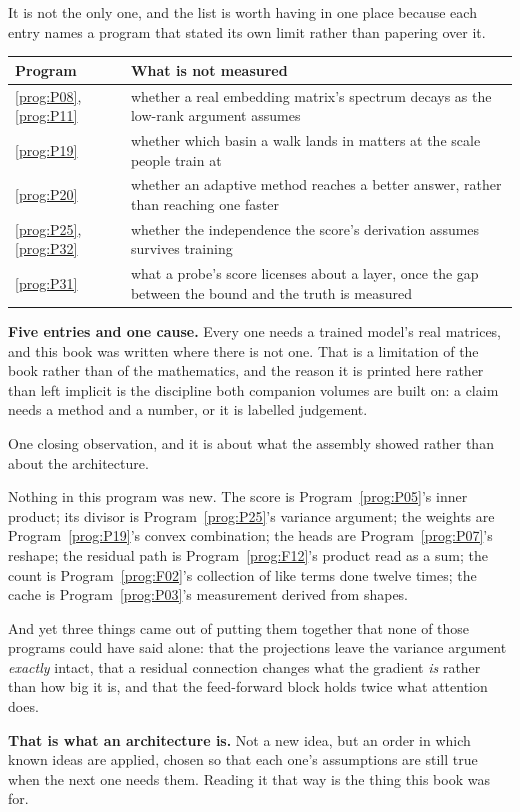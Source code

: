 \begin{fr}
It is not the only one, and the list is worth having in one place because
each entry names a program that stated its own limit rather than papering
over it.

\begin{center}
\begin{tabularx}{\linewidth}{lX}
\toprule
Program & What is not measured \\
\midrule
\ref{prog:P08}, \ref{prog:P11} & whether a real embedding matrix's spectrum
  decays as the low-rank argument assumes \\
\ref{prog:P19} & whether which basin a walk lands in matters at the scale
  people train at \\
\ref{prog:P20} & whether an adaptive method reaches a better answer, rather
  than reaching one faster \\
\ref{prog:P25}, \ref{prog:P32} & whether the independence the score's
  derivation assumes survives training \\
\ref{prog:P31} & what a probe's score licenses about a layer, once the
  gap between the bound and the truth is measured \\
\bottomrule
\end{tabularx}
\end{center}

\textbf{Five entries and one cause.} Every one needs a trained model's real
matrices, and this book was written where there is not one. That is a
limitation of the book rather than of the mathematics, and the reason it is
printed here rather than left implicit is the discipline both companion
volumes are built on: a claim needs a method and a number, or it is labelled
judgement.
\end{fr}

\begin{fr}
One closing observation, and it is about what the assembly showed rather
than about the architecture.

Nothing in this program was new. The score is Program~\ref{prog:P05}'s inner
product; its divisor is Program~\ref{prog:P25}'s variance argument; the
weights are Program~\ref{prog:P19}'s convex combination; the heads are
Program~\ref{prog:P07}'s reshape; the residual path is
Program~\ref{prog:F12}'s product read as a sum; the count is
Program~\ref{prog:F02}'s collection of like terms done twelve times; the
cache is Program~\ref{prog:P03}'s measurement derived from shapes.

And yet three things came out of putting them together that none of those
programs could have said alone: that the projections leave the variance
argument \emph{exactly} intact, that a residual connection changes what the
gradient \emph{is} rather than how big it is, and that the feed-forward
block holds twice what attention does.

\textbf{That is what an architecture is.} Not a new idea, but an order in
which known ideas are applied, chosen so that each one's assumptions are
still true when the next one needs them. Reading it that way is the thing
this book was for.
\end{fr}

